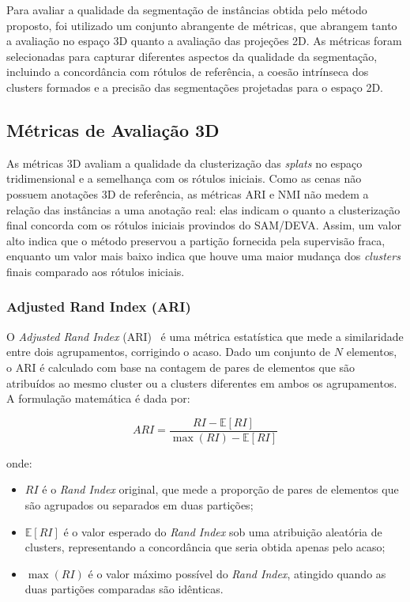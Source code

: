 Para avaliar a qualidade da segmentação de instâncias obtida pelo método proposto, foi utilizado um conjunto abrangente de métricas, que abrangem tanto a avaliação no espaço 3D quanto a avaliação das projeções 2D. As métricas foram selecionadas para capturar diferentes aspectos da qualidade da segmentação, incluindo a concordância com rótulos de referência, a coesão intrínseca dos clusters formados e a precisão das segmentações projetadas para o espaço 2D.

\subsection{Métricas de Avaliação 3D}

As métricas 3D avaliam a qualidade da clusterização das \emph{splats} no espaço tridimensional e a semelhança com os rótulos iniciais. Como as cenas não possuem anotações 3D de referência, as métricas ARI e NMI não medem a relação das instâncias a uma anotação real: elas indicam o quanto a clusterização final concorda com os rótulos iniciais provindos do SAM/DEVA. Assim, um valor alto indica que o método preservou a partição fornecida pela supervisão fraca, enquanto um valor mais baixo indica que houve uma maior mudança dos \textit{clusters} finais comparado aos rótulos iniciais.

\subsubsection{Adjusted Rand Index (ARI)}

O \textit{Adjusted Rand Index} (ARI)~\cite{hubert1985comparing} é uma métrica estatística que mede a similaridade entre dois agrupamentos, corrigindo o acaso. Dado um conjunto de $N$ elementos, o ARI é calculado com base na contagem de pares de elementos que são atribuídos ao mesmo cluster ou a clusters diferentes em ambos os agrupamentos. A formulação matemática é dada por:

\[
ARI = \frac{RI - \mathbb{E}[RI]}{\max(RI) - \mathbb{E}[RI]}
\]

onde:
\begin{itemize}
    \item $RI$ é o \textit{Rand Index} original, que mede a proporção de pares de elementos que são agrupados ou separados em duas partições;

    \item $\mathbb{E}[RI]$ é o valor esperado do \textit{Rand Index} sob uma atribuição aleatória de clusters, representando a concordância que seria obtida apenas pelo acaso;

    \item $\max(RI)$ é o valor máximo possível do \textit{Rand Index}, atingido quando as duas partições comparadas são idênticas.
\end{itemize}


